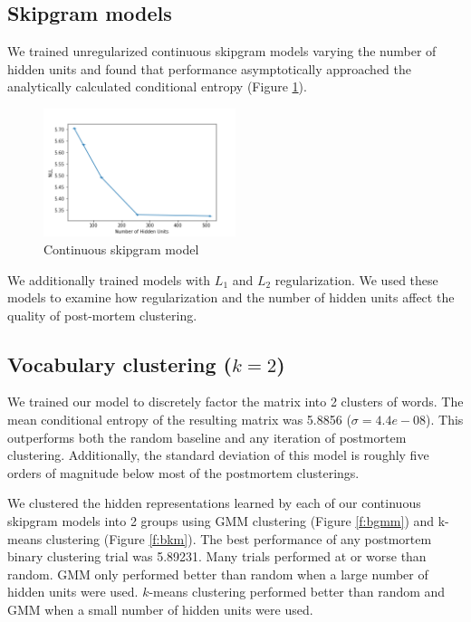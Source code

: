 \documentclass[11pt,letterpaper]{article}
\begin{document}
\subsection{Skipgram models}

We trained unregularized continuous skipgram models varying the number of hidden units and found that performance asymptotically approached the analytically calculated conditional entropy (Figure \ref{f:baseline}). 

\begin{figure}
  \caption{Continuous skipgram model}
\label{f:baseline}
  \centering
    \includegraphics[width=0.5\textwidth]{baseline.png}
\end{figure}

We additionally trained models with $L_1$ and $L_2$ regularization. We used these models to examine how regularization and the number of hidden units affect the quality of post-mortem clustering. 

\subsection{Vocabulary clustering ($k=2$)}

We trained our model to discretely factor the matrix into 2 clusters of words. The mean conditional entropy of the resulting matrix was 5.8856 ($\sigma=4.4e-08$). This outperforms both the random baseline and any iteration of postmortem clustering. Additionally, the standard deviation of this model is roughly five orders of magnitude below most of the postmortem clusterings.

We clustered the hidden representations learned by each of our continuous skipgram models into 2 groups using GMM clustering (Figure \ref{f:bgmm}) and k-means clustering (Figure \ref{f:bkm}). The best performance of any postmortem binary clustering trial was 5.89231. Many trials performed at or worse than random. GMM only performed better than random when a large number of hidden units were used. $k$-means clustering performed better than random and GMM when a small number of hidden units were used.
\end{document}
